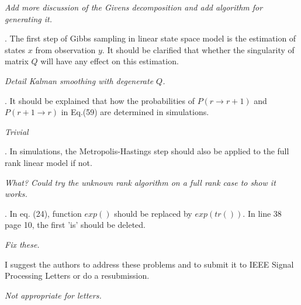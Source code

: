 \documentclass{article}
\newenvironment{review}[0]{\begin{itshape}\color{Gray}\noindent}{\end{itshape}\vspace{0.4cm}}
\newenvironment{response}[0]{\noindent}{\vspace{0.4cm}}
\newcommand{\meta}[1]{{\color{red}\em #1}}
\begin{document}
\begin{response}
 \meta{Add more discussion of the Givens decomposition and add algorithm for generating it.}
\end{response}

\begin{review}
5.   The first step of Gibbs sampling in linear state space model is the estimation of states $x$ from observation $y$. It should be clarified that whether the singularity of matrix $Q$ will have any effect on this estimation. 
\end{review}

\begin{response}
 \meta{Detail Kalman smoothing with degenerate $Q$.}
\end{response}

\begin{review}
6.  It should be explained that how the probabilities of $P(r \to r+1)$ and $P(r+1 \to r)$ in Eq.(59) are determined in simulations.
\end{review}

\begin{response}
 \meta{Trivial}
\end{response}

\begin{review}
7.  In simulations, the Metropolis-Hastings step should also be applied to the full rank linear model if not. 
\end{review}

\begin{response}
 \meta{What? Could try the unknown rank algorithm on a full rank case to show it works.}
\end{response}

\begin{review}
8.  In eq. (24), function $exp()$ should be replaced by $exp(tr())$. In line 38 page 10, the first 'is' should be deleted.
\end{review}

\begin{response}
 \meta{Fix these.}
\end{response}

\begin{review}
I suggest the authors to address these problems and to submit it to IEEE Signal Processing Letters or do a resubmission.
\end{review}

\begin{response}
 \meta{Not appropriate for letters.}
\end{response}
\end{document}
